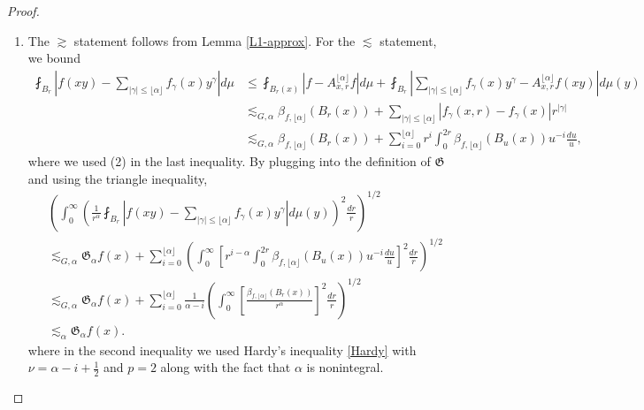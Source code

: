 \documentclass[11pt,reqno]{amsart}
\newcommand{\1}{\mathbf 1}
\begin{document}
\begin{proof}
\begin{enumerate}
    \item The $\gtrsim$ statement follows from Lemma \ref{L1-approx}. For the $\lesssim$ statement, we bound
\begin{align*}
\fint_{B_r}\left|f\left(xy\right)-\sum_{\left|\gamma\right|\le \lfloor \alpha \rfloor} f_\gamma\left(x\right)y^\gamma\right|d\mu&\le \fint_{B_r\left(x\right)}\left|f-A^{\lfloor \alpha \rfloor}_{x,r}f\right|d\mu+\fint_{B_r}\left|\sum_{\left|\gamma\right|\le \lfloor \alpha \rfloor} f_\gamma\left(x\right)y^\gamma-A^{\lfloor \alpha \rfloor}_{x,r}f\left(xy\right)\right|d\mu\left(y\right)\\
&\lesssim_{G,\alpha} \beta_{f,\lfloor \alpha \rfloor}\left(B_r\left(x\right)\right)+\sum_{\left|\gamma\right|\le \lfloor \alpha \rfloor}\left|f_\gamma\left(x,r\right)-f_\gamma \left(x\right)\right|r^{\left|\gamma\right|}\\
&\lesssim_{G,\alpha} \beta_{f,\lfloor \alpha \rfloor}\left(B_r\left(x\right)\right)+\sum_{i=0}^{\lfloor \alpha \rfloor} r^i \int_0^{2r} \beta_{f,\lfloor \alpha \rfloor}\left(B_u\left(x\right)\right)u^{-i}\frac{du}{u},
\end{align*}
where we used (2) in the last inequality. By plugging into the definition of $\mathfrak{G}$ and using the triangle inequality,
\begin{align*}
    &\left(\int_0^\infty \left(\frac{1}{r^\alpha}\fint_{B_r}\left|f\left(xy\right)-\sum_{\left|\gamma\right|\le \lfloor \alpha \rfloor} f_\gamma\left(x\right)y^\gamma\right|d\mu\left(y\right)\right)^2 \frac{dr}r\right)^{1/2}\\
    &\lesssim_{G,\alpha} \mathfrak{G}_\alpha f\left(x\right)+\sum_{i=0}^{\lfloor \alpha \rfloor} \left(\int_0^\infty \left[r^{i-\alpha} \int_0^{2r} \beta_{f,\lfloor \alpha \rfloor}\left(B_u\left(x\right)\right)u^{-i}\frac{du}{u}\right]^{2}\frac{dr}{r}\right)^{1/2}\\
    &\lesssim_{G,\alpha} \mathfrak{G}_\alpha f\left(x\right)+\sum_{i=0}^{\lfloor \alpha \rfloor} \frac{1}{\alpha-i}\left(\int_0^\infty \left[\frac{\beta_{f,\lfloor \alpha \rfloor}\left(B_r\left(x\right)\right)}{r^\alpha}\right]^2 \frac{dr}{r}\right)^{1/2}\\
    &\lesssim_\alpha \mathfrak{G}_\alpha f\left(x\right).
\end{align*}
where in the second inequality we used Hardy's inequality \eqref{Hardy} with $\nu=\alpha-i+\frac 12$ and $p=2$ along with the fact that $\alpha$ is nonintegral.


\end{enumerate}
\end{proof}
\end{document}

